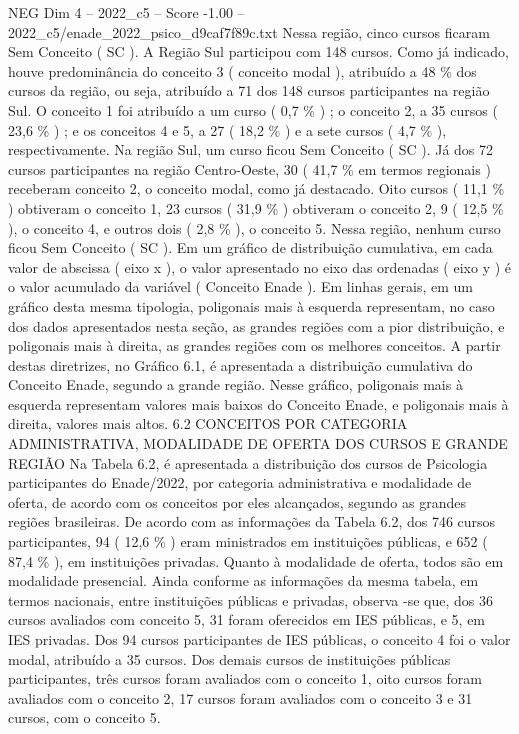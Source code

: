 \begin{textsample}{NEG Dim 4 – 2022\_c5 – Score -1.00 – 2022\_c5/enade\_2022\_psico\_d9caf7f89c.txt}
Nessa região, cinco cursos ficaram Sem Conceito ( SC ).
A Região Sul participou com 148 cursos.
Como já indicado, houve predominância do conceito 3 ( conceito modal ), atribuído a 48 \% dos cursos da região, ou seja, atribuído a 71 dos 148 cursos participantes na região Sul.
O conceito 1 foi atribuído a um curso ( 0,7 \% ) ; o conceito 2, a 35 cursos ( 23,6 \% ) ; e os conceitos 4 e 5, a 27 ( 18,2 \% ) e a sete cursos ( 4,7 \% ), respectivamente.
Na região Sul, um curso ficou Sem Conceito ( SC ).
Já dos 72 cursos participantes na região Centro-Oeste, 30 ( 41,7 \% em termos regionais ) receberam conceito 2, o conceito modal, como já destacado.
Oito cursos ( 11,1 \% ) obtiveram o conceito 1, 23 cursos ( 31,9 \% ) obtiveram o conceito 2, 9 ( 12,5 \% ), o conceito 4, e outros dois ( 2,8 \% ), o conceito 5.
Nessa região, nenhum curso ficou Sem Conceito ( SC ).
Em um gráfico de distribuição cumulativa, em cada valor de abscissa ( eixo x ), o valor apresentado no eixo das ordenadas ( eixo y ) é o valor acumulado da variável ( Conceito Enade ).
Em linhas gerais, em um gráfico desta mesma tipologia, poligonais mais à esquerda representam, no caso dos dados apresentados nesta seção, as grandes regiões com a pior distribuição, e poligonais mais à direita, as grandes regiões com os melhores conceitos.
A partir destas diretrizes, no Gráfico 6.1, é apresentada a distribuição cumulativa do Conceito Enade, segundo a grande região.
Nesse gráfico, poligonais mais à esquerda representam valores mais baixos do Conceito Enade, e poligonais mais à direita, valores mais altos. 6.2 CONCEITOS POR CATEGORIA ADMINISTRATIVA, MODALIDADE DE OFERTA DOS CURSOS E GRANDE REGIÃO Na Tabela 6.2, é apresentada a distribuição dos cursos de Psicologia participantes do Enade/2022, por categoria administrativa e modalidade de oferta, de acordo com os conceitos por eles alcançados, segundo as grandes regiões brasileiras.
De acordo com as informações da Tabela 6.2, dos 746 cursos participantes, 94 ( 12,6 \% ) eram ministrados em instituições públicas, e 652 ( 87,4 \% ), em instituições privadas.
Quanto à modalidade de oferta, todos são em modalidade presencial.
Ainda conforme as informações da mesma tabela, em termos nacionais, entre instituições públicas e privadas, observa -se que, dos 36 cursos avaliados com conceito 5, 31 foram oferecidos em IES públicas, e 5, em IES privadas.
Dos 94 cursos participantes de IES públicas, o conceito 4 foi o valor modal, atribuído a 35 cursos.
Dos demais cursos de instituições públicas participantes, três cursos foram avaliados com o conceito 1, oito cursos foram avaliados com o conceito 2, 17 cursos foram avaliados com o conceito 3 e 31 cursos, com o conceito 5.

\end{textsample}
